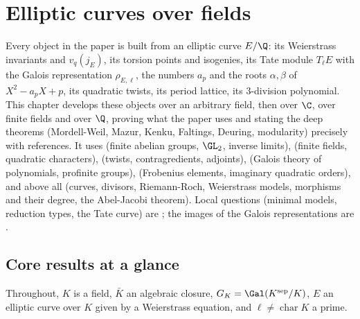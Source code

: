\chapter{Elliptic curves over fields}\label{ch:ellcurves}

Every object in the paper is built from an elliptic curve $E/\Q$: its Weierstrass invariants and $v_q(j_E)$, its torsion points and isogenies, its Tate module $T_\ell E$ with the Galois
representation $\rho_{E,\ell}$, the numbers $a_p$ and the roots $\alpha,\beta$ of $X^2-a_pX+p$, its quadratic twists, its period lattice, its $3$-division polynomial. This chapter develops
these objects over an arbitrary field, then over $\C$, over finite fields and over $\Q$, proving what the paper uses and stating the deep theorems (Mordell-Weil, Mazur, Kenku, Faltings,
Deuring, modularity) precisely with references. It uses  (finite abelian groups, $\GL_2$, inverse limits),  (finite fields, quadratic characters),
 (twists, contragredients, adjoints),  (Galois theory of polynomials, profinite groups),  (Frobenius elements, imaginary quadratic orders), and
above all  (curves, divisors, Riemann-Roch, Weierstrass models, morphisms and their degree, the Abel-Jacobi theorem). Local questions (minimal models, reduction types,
the Tate curve) are ; the images of the Galois representations are .

\section*{Core results at a glance}

Throughout, $K$ is a field, $\bar K$ an algebraic closure, $G_K=\Gal(K^{\mathrm{sep}}/K)$, $E$ an elliptic curve over $K$ given by a Weierstrass equation, and $\ell\ne\operatorname{char}K$ a prime.

